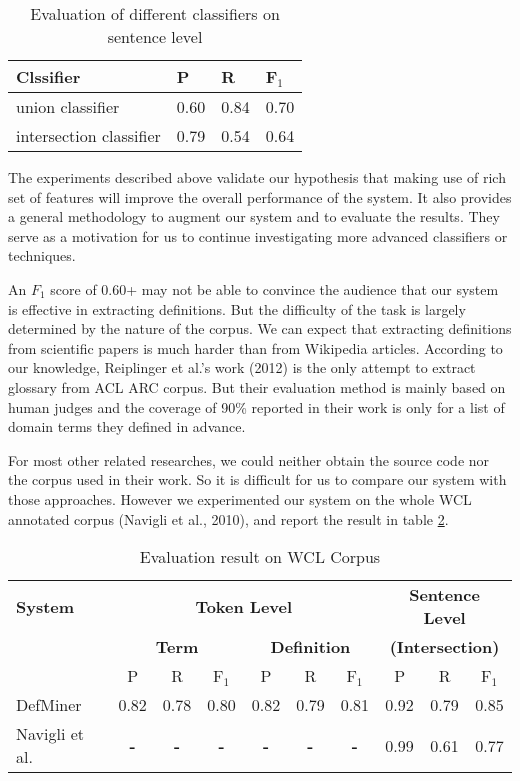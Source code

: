 \documentclass[hyp]{socreport}
\begin{document}
\begin{table}
	
    \centering
    \begin{tabular}{|p{4.1cm}|p{2.1cm}|p{2.1cm}|p{2.1cm}|}
\hline
        \bf{Clssifier}                            & \bf{P}                                  & \bf{R} & \bf{F$_1$}                     \\ \hline
        union classifier     & 0.60   & 0.84  & 0.70                   \\ \hline
        intersection classifier & 0.79 & 0.54    & 0.64 \\ 
        \hline
    \end{tabular}
    \caption{Evaluation of different classifiers on sentence level}
    \label{sentence}
\end{table}

The experiments described above validate our hypothesis that making use of rich set of features will improve the overall performance of the system. It also provides a general methodology to augment our system and to evaluate the results. They serve as a motivation for us to continue investigating more advanced classifiers or techniques. 

An $F_1$ score of 0.60+ may not be able to convince the audience that our system is effective in extracting definitions. But the difficulty of the task is largely determined by the nature of the corpus. We can expect that extracting definitions from scientific papers is much harder than from Wikipedia articles. According to our knowledge, Reiplinger et al.'s work (2012) is the only attempt to extract glossary from ACL ARC corpus. But their evaluation method is mainly based on human judges and the coverage of 90\% reported in their work is only for a list of domain terms they defined in advance. 

For most other related researches, we could neither obtain the source code nor the corpus used in their work. So it is difficult for us to compare our system with those approaches. However we experimented our system on the whole WCL annotated corpus (Navigli et al., 2010), and report the result in table \ref{wcl}.

\begin{table}
	
    \centering
\begin{tabular}{|p{3cm}|c|c|c|c|c|c|c|c|c|} 
\hline 
\bf{System} & \multicolumn{6}{|c|}{\bf{Token Level}} & \multicolumn{3}{|c|}{\bf{Sentence Level}} \\ 
\cline{2-7} 
& \multicolumn{3}{|c|}{\bf{Term}} & \multicolumn{3}{|c|}{\bf{Definition}} & \multicolumn{3}{|c|}{\bf{(Intersection)}} \\ 
\cline{2-10}
 & P &R &F$_1$ & P &R &F$_1$ & P &R &F$_1$\\ 
\hline 
DefMiner & 0.82 & 0.78 & 0.80 & 0.82 & 0.79 & 0.81 & 0.92 & 0.79 & 0.85 \\ \hline 
Navigli et al. & \bf{-} & \bf{-} & \bf{-} & \bf{-} & \bf{-} & \bf{-} & 0.99 & 0.61 & 0.77 \\ \hline 
    \end{tabular}
    \caption{Evaluation result on WCL Corpus}
    \label{wcl}
\end{table}
\end{document}
